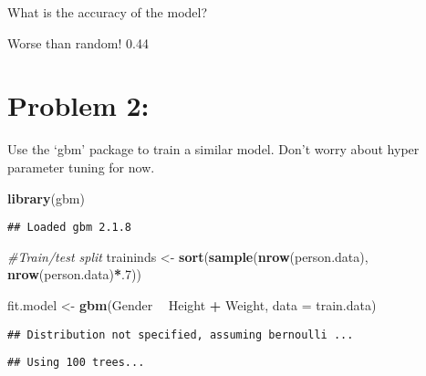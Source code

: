 \documentclass[
]{article}
\newenvironment{Shaded}{\begin{snugshade}}{\end{snugshade}}
\newcommand{\CommentTok}[1]{\textcolor[rgb]{0.56,0.35,0.01}{\textit{#1}}}
\newcommand{\DataTypeTok}[1]{\textcolor[rgb]{0.13,0.29,0.53}{#1}}
\newcommand{\DecValTok}[1]{\textcolor[rgb]{0.00,0.00,0.81}{#1}}
\newcommand{\KeywordTok}[1]{\textcolor[rgb]{0.13,0.29,0.53}{\textbf{#1}}}
\newcommand{\NormalTok}[1]{#1}
\newcommand{\OperatorTok}[1]{\textcolor[rgb]{0.81,0.36,0.00}{\textbf{#1}}}
\newcommand{\StringTok}[1]{\textcolor[rgb]{0.31,0.60,0.02}{#1}}
\begin{document}
What is the accuracy of the model?

Worse than random! 0.44

\hypertarget{problem-2}{%
\section{Problem 2:}\label{problem-2}}

Use the `gbm' package to train a similar model. Don't worry about hyper
parameter tuning for now.

\begin{Shaded}
\begin{Highlighting}[]
\KeywordTok{library}\NormalTok{(gbm)}
\end{Highlighting}
\end{Shaded}

\begin{verbatim}
## Loaded gbm 2.1.8
\end{verbatim}

\begin{Shaded}
\begin{Highlighting}[]
\CommentTok{#Train/test split}
\NormalTok{traininds <-}\StringTok{ }\KeywordTok{sort}\NormalTok{(}\KeywordTok{sample}\NormalTok{(}\KeywordTok{nrow}\NormalTok{(person.data), }\KeywordTok{nrow}\NormalTok{(person.data)}\OperatorTok{*}\NormalTok{.}\DecValTok{7}\NormalTok{))}

\NormalTok{fit.model <-}\StringTok{ }\KeywordTok{gbm}\NormalTok{(Gender }\OperatorTok{~}\StringTok{ }\NormalTok{Height }\OperatorTok{+}\StringTok{ }\NormalTok{Weight, }\DataTypeTok{data =}\NormalTok{ train.data)}
\end{Highlighting}
\end{Shaded}

\begin{verbatim}
## Distribution not specified, assuming bernoulli ...
\end{verbatim}

\begin{Shaded}
\end{Shaded}

\begin{verbatim}
## Using 100 trees...
\end{verbatim}
\end{document}
